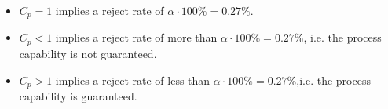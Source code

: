 \begin{itemize}
  \item $C_p = 1$ implies a reject rate of $\alpha \cdot 100\% = 0.27\%$.
  \item $C_p < 1$ implies a reject rate of more than $\alpha \cdot 100\% = 0.27\%$, i.e. the process capability is not guaranteed.
  \item $C_p > 1$ implies a reject rate of less than $\alpha \cdot 100\% = 0.27\%$,i.e. the process capability is guaranteed.

\end{itemize}
